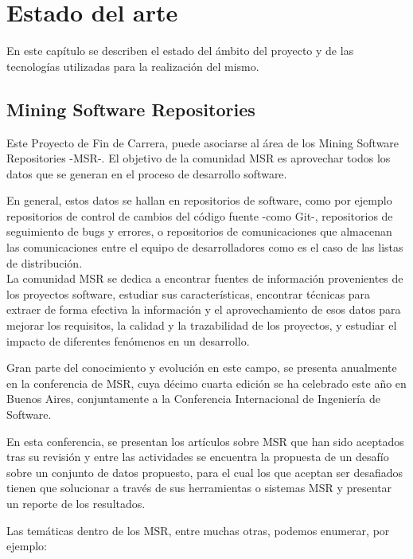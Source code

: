\cleardoublepage
\chapter{Estado del arte}


En este capítulo se describen el estado del ámbito del proyecto y de las tecnologías utilizadas para la realización del mismo.


\section{Mining Software Repositories}

Este Proyecto de Fin de Carrera, puede asociarse al área de los Mining Software Repositories -MSR-. El objetivo de la comunidad MSR es aprovechar todos los datos que se generan en el proceso de desarrollo software.


En general, estos datos se hallan en repositorios de software, como por ejemplo repositorios de control de cambios del código fuente -como Git-, repositorios de seguimiento de bugs y errores, o repositorios de comunicaciones que almacenan las comunicaciones entre el equipo de desarrolladores como es el caso de las listas de distribución. \\

La comunidad MSR se dedica a encontrar fuentes de información provenientes de los proyectos software, estudiar sus características, encontrar técnicas para extraer de forma efectiva la información y el aprovechamiento de esos datos para mejorar los requisitos, la calidad y la trazabilidad de los proyectos, y estudiar el impacto de diferentes fenómenos en un desarrollo.


Gran parte del conocimiento y evolución en este campo, se presenta anualmente en la conferencia de MSR, cuya décimo cuarta edición se ha celebrado este año en Buenos Aires, conjuntamente a la Conferencia Internacional de Ingeniería de Software.


En esta conferencia, se presentan los artículos sobre MSR que han sido aceptados tras su revisión y entre las actividades se encuentra la propuesta de un desafío sobre un conjunto de datos propuesto, para el cual los que aceptan ser desafiados tienen que solucionar a través de sus herramientas o sistemas MSR y presentar un reporte de los resultados.


Las temáticas dentro de los MSR, entre muchas otras, podemos enumerar, por ejemplo:

